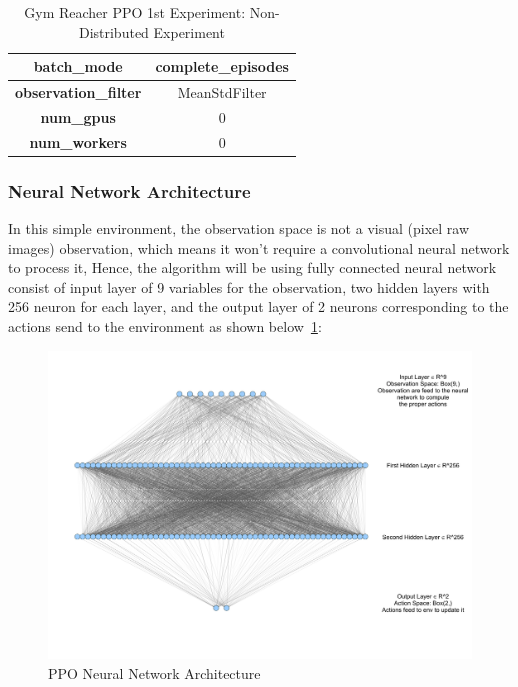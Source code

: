 \begin{table}[!htb]
\begin{tabular}{|c|l|l|c|l|l|}
				\multicolumn{3}{|c|}{\textbf{batch\_mode}}                          & \multicolumn{3}{c|}{complete\_episodes}                                             \\ \hline
				\multicolumn{3}{|c|}{\textbf{observation\_filter}}                  & \multicolumn{3}{c|}{MeanStdFilter}                                                  \\ \hline
				\multicolumn{3}{|c|}{\cellcolor[HTML]{C0C0C0}\textbf{num\_gpus}}    & \multicolumn{3}{c|}{\cellcolor[HTML]{C0C0C0}0}                                      \\ \hline
				\multicolumn{3}{|c|}{\cellcolor[HTML]{C0C0C0}\textbf{num\_workers}} & \multicolumn{3}{c|}{\cellcolor[HTML]{C0C0C0}0}                                      \\ \hline
		\end{tabular}
		\caption{Gym Reacher PPO 1st Experiment: Non-Distributed Experiment}
		\label{tab:gym_reacher_ppo_1st_exp}
\end{table}


\subsubsection{Neural Network Architecture}
In this simple environment, the observation space is not a visual (pixel raw images) observation, which means it won't require a convolutional neural network to process it, Hence, the algorithm will be using fully connected neural network consist of input layer of 9 variables for the observation, two hidden layers with 256 neuron for each layer, and the output layer of 2 neurons corresponding to the actions send to the environment as shown below~\ref{fig:ppo_nn}:

\begin{figure}[H] %
		\centering
		\includegraphics[width=\linewidth]{figures/exps/1st_exp/ppo_nn}
		\caption{PPO Neural Network Architecture}
		\label{fig:ppo_nn}
\end{figure}


